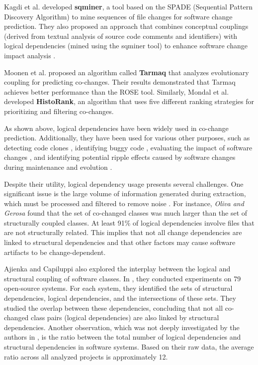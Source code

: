 Kagdi et al. \cite{article-Kagdi-commit, msr-kagdi} developed \textbf{sqminer}, a tool based on the SPADE (Sequential Pattern Discovery Algorithm) to mine sequences of file changes for software change prediction. They also proposed an approach that combines conceptual couplings (derived from textual analysis of source code comments and identifiers) with logical dependencies (mined using the sqminer tool) to enhance software change impact analysis \cite{article-Kagdi-commit}.

Moonen et al. \cite{Moonen-commit, article-Moonen, 7476643} proposed an algorithm called \textbf{Tarmaq} that analyzes evolutionary coupling for predicting co-changes. Their results demonstrated that Tarmaq achieves better performance than the ROSE tool. Similarly, Mondal et al. \cite{HistoRank} developed \textbf{HistoRank}, an algorithm that uses five different ranking strategies for prioritizing and filtering co-changes.

As shown above, logical dependencies have been widely used in co-change prediction. Additionally, they have been used for various other purposes, such as detecting code clones \cite{Mandal-clones}, identifying buggy code \cite{buggy-code}, evaluating the impact of software changes \cite{1553643}, and identifying potential ripple effects caused by software changes during maintenance and evolution \cite{DBLP:conf/issre/OlivaG15, Oliva:2011:ISL:2067853.2068086}.

Despite their utility, logical dependency usage presents several challenges. One significant issue is the large volume of information generated during extraction, which must be processed and filtered to remove noise \cite{Coupling-Lanza, articleEvolution, Shtern:2012:CMS:2332427.2332428}. For instance, \textit{Oliva and Gerosa} \cite{Oliva:2011:ISL:2067853.2068086} found that the set of co-changed classes was much larger than the set of structurally coupled classes. At least 91\% of logical dependencies involve files that are not structurally related. This implies that not all change dependencies are linked to structural dependencies and that other factors may cause software artifacts to be change-dependent.

Ajienka and Capiluppi also explored the interplay between the logical and structural coupling of software classes. In \cite{DBLP:journals/jss/AjienkaC17, DBLP:journals/ese/AjienkaCC18}, they conducted experiments on 79 open-source systems. For each system, they identified the sets of structural dependencies, logical dependencies, and the intersections of these sets. They studied the overlap between these dependencies, concluding that not all co-changed class pairs (logical dependencies) are also linked by structural dependencies. Another observation, which was not deeply investigated by the authors in \cite{DBLP:journals/jss/AjienkaC17, DBLP:journals/ese/AjienkaCC18}, is the ratio between the total number of logical dependencies and structural dependencies in software systems. Based on their raw data, the average ratio across all analyzed projects is approximately 12.

